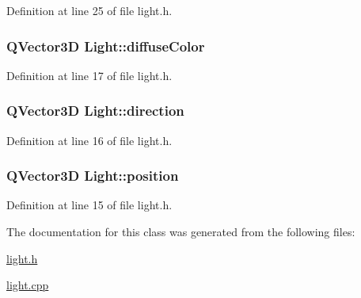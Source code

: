 Definition at line 25 of file light.\+h.

\hypertarget{class_light_a4e0f72de18d88038e3d9e8c0b5318ec7}{}
\subsubsection[{diffuse\+Color}]{\setlength{\rightskip}{0pt plus 5cm}Q\+Vector3\+D Light\+::diffuse\+Color\hspace{0.3cm}{\ttfamily [protected]}}\label{class_light_a4e0f72de18d88038e3d9e8c0b5318ec7}


Definition at line 17 of file light.\+h.

\hypertarget{class_light_ae3a1c33d67bfb4fa2e16ce5e5b2021a4}{}
\subsubsection[{direction}]{\setlength{\rightskip}{0pt plus 5cm}Q\+Vector3\+D Light\+::direction\hspace{0.3cm}{\ttfamily [protected]}}\label{class_light_ae3a1c33d67bfb4fa2e16ce5e5b2021a4}


Definition at line 16 of file light.\+h.

\hypertarget{class_light_ab4989464d97bfcfecea32f2a89181be7}{}
\subsubsection[{position}]{\setlength{\rightskip}{0pt plus 5cm}Q\+Vector3\+D Light\+::position\hspace{0.3cm}{\ttfamily [protected]}}\label{class_light_ab4989464d97bfcfecea32f2a89181be7}


Definition at line 15 of file light.\+h.



The documentation for this class was generated from the following files\+:\begin{DoxyCompactItemize}
\item 
\hyperlink{light_8h}{light.\+h}\item 
\hyperlink{light_8cpp}{light.\+cpp}\end{DoxyCompactItemize}
